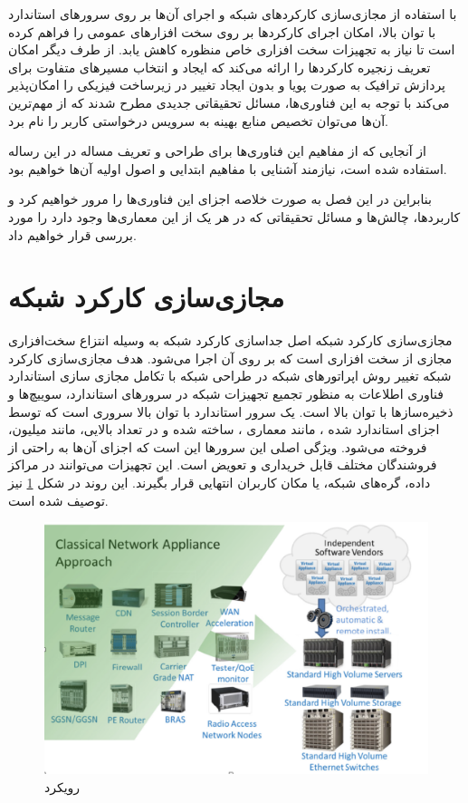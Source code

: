 با استفاده از مجازی‌سازی کارکردهای شبکه و اجرای آن‌ها بر روی سرورهای استاندارد با توان بالا،
امکان اجرای کارکردها بر روی سخت افزارهای عمومی را فراهم کرده است تا نیاز به تجهیزات سخت افزاری خاص منظوره کاهش یابد.
از طرف دیگر  امکان تعریف زنجیره کارکردها را ارائه می‌کند که ایجاد
و انتخاب مسیرهای متفاوت برای پردازش ترافیک به صورت پویا و بدون ایجاد تغییر در زیرساخت فیزیکی را امکان‌پذیر می‌کند
با توجه به این فناوری‌ها، مسائل تحقیقاتی جدیدی مطرح شدند که از مهم‌ترین آن‌ها می‌توان تخصیص منابع بهینه به سرویس درخواستی کاربر را نام برد.

از آنجایی که از مفاهیم این فناور‌ی‌ها برای طراحی و تعریف مساله در این رساله استفاده شده است، نیازمند آشنایی با مفاهیم ابتدایی و اصول اولیه آن‌ها خواهیم بود.

بنابراین در این فصل به صورت خلاصه اجزای این فناوری‌ها را مرور خواهیم کرد و کاربردها، چالش‌ها و مسائل تحقیقاتی که در هر یک از این معماری‌ها وجود دارد را مورد بررسی قرار خواهیم داد.

\section{مجازی‌سازی کارکرد شبکه}

مجازی‌سازی کارکرد شبکه اصل جداسازی کارکرد شبکه به وسیله انتزاع سخت‌افزاری مجازی از سخت افزاری است که بر روی آن اجرا می‌شود.
هدف مجازی‌سازی کارکرد شبکه تغییر روش اپراتورهای شبکه در طراحی شبکه
با تکامل مجازی سازی استاندارد فناوری اطلاعات به منظور تجمیع تجهیزات شبکه
در سرورهای استاندارد، سوییچ‌ها و ذخیره‌سازها با توان بالا است.
یک سرور استاندارد با توان بالا سروری است که توسط اجزای استاندارد شده ،
مانند معماری ، ساخته شده و
در تعداد بالایی، مانند میلیون،
فروخته می‌شود.
ویژگی اصلی این سرورها این است که اجزای آن‌ها به راحتی از فروشندگان مختلف قابل خریداری و
تعویض است.
این تجهیزات می‌توانند در مراکز داده، گره‌های شبکه، یا مکان کاربران انتهایی قرار بگیرند.
این روند در
شکل
\ref{fig.6}
نیز توصیف شده است.

\begin{figure}[!h]
\center\includegraphics[scale=.5]{images/nfv-concept}
\caption{رویکرد }\label{fig.6}
\end{figure}

